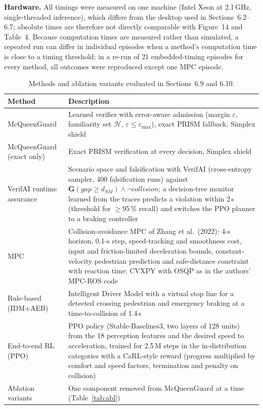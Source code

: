 \documentclass[11pt]{article}
\begin{document}
\textbf{Hardware.} All timings were measured on one machine (Intel Xeon at 2.1\,GHz, single-threaded inference), which differs from the
desktop used in Sections~6.2--6.7; absolute times are therefore not directly comparable with Figure~14 and Table~4. Because computation
times are measured rather than simulated, a repeated run can differ in individual episodes when a method's computation time is close to a
timing threshold; in a re-run of 21 embedded-timing episodes for every method, all outcomes were reproduced except one MPC episode.

\begin{table}[h]
\centering\small
\caption{Methods and ablation variants evaluated in Sections~6.9 and 6.10.}\label{tab:methods}
\begin{tabularx}{\linewidth}{lY}
\toprule
Method & Description \\
\midrule
McQueenGuard & Learned verifier with error-aware admission (margin $\varepsilon$, familiarity set $\mathcal{H}$, $\varepsilon\le\varepsilon_{\max}$), exact PRISM fallback, Simplex shield \\
McQueenGuard (exact only) & Exact PRISM verification at every decision, Simplex shield \\
VerifAI runtime assurance & Scenario space and falsification with VerifAI (cross-entropy sampler, 400 falsification runs) against $\mathbf{G}(\mathit{gap}\ge d_{SM})\wedge\neg\mathit{collision}$; a decision-tree monitor learned from the traces predicts a violation within 2\,s (threshold for $\ge$95\,\% recall) and switches the PPO planner to a braking controller \\
MPC & Collision-avoidance MPC of Zhang et al.\ (2022): 4-s horizon, 0.1-s step, speed-tracking and smoothness cost, input and friction-limited deceleration bounds, constant-velocity pedestrian prediction and safe-distance constraint with reaction time; CVXPY with OSQP as in the authors' MPC-ROS code \\
Rule-based (IDM+AEB) & Intelligent Driver Model with a virtual stop line for a detected crossing pedestrian and emergency braking at a time-to-collision of 1.4\,s \\
End-to-end RL (PPO) & PPO policy (Stable-Baselines3, two layers of 128 units) from the 18 perception features and the desired speed to acceleration, trained for 2.5\,M steps in the in-distribution categories with a CaRL-style reward (progress multiplied by comfort and speed factors, termination and penalty on collision) \\
Ablation variants & One component removed from McQueenGuard at a time (Table~\ref{tab:abl}) \\
\bottomrule
\end{tabularx}
\end{table}
\end{document}
